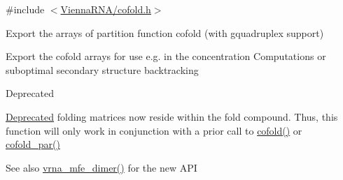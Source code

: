 {\ttfamily \#include $<$\hyperlink{cofold_8h}{Vienna\+R\+N\+A/cofold.\+h}$>$}



Export the arrays of partition function cofold (with gquadruplex support) 

Export the cofold arrays for use e.\+g. in the concentration Computations or suboptimal secondary structure backtracking

\begin{DoxyRefDesc}{Deprecated}
\item[\hyperlink{deprecated__deprecated000035}{Deprecated}]folding matrices now reside within the fold compound. Thus, this function will only work in conjunction with a prior call to \hyperlink{group__mfe__cofold_gabc8517f22cfe70595ee81fc837910d52}{cofold()} or \hyperlink{group__mfe__cofold_ga7612cfeeb1b793f1e4179b1eb53df1f3}{cofold\+\_\+par()}\end{DoxyRefDesc}


\begin{DoxySeeAlso}{See also}
\hyperlink{group__mfe__cofold_gaab22d10c1190f205f16a77cab9d5d3ee}{vrna\+\_\+mfe\+\_\+dimer()} for the new A\+PI
\end{DoxySeeAlso}


